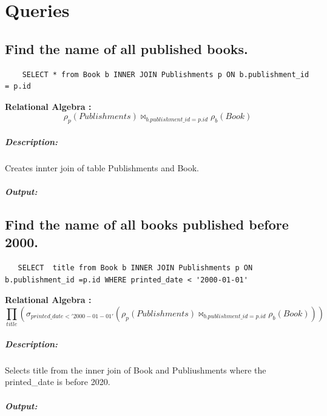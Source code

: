 \documentclass{report}
\begin{document}
\chapter{Queries}

\section{Find the name of all published books.}

\begin{lstlisting}
    SELECT * from Book b INNER JOIN Publishments p ON b.publishment_id = p.id
\end{lstlisting}
\vspace{0.5cm}
\textbf{Relational Algebra :} \[  \rho_p(Publishments) \bowtie_{b.publishment\_id = p.id}  \rho_b(Book)   \]
\paragraph{Description: }
Creates innter join of table Publishments and Book.

\paragraph{Output: }



\section{Find the name of all books published before 2000.}

\begin{lstlisting}
   SELECT  title from Book b INNER JOIN Publishments p ON b.publishment_id =p.id WHERE printed_date < '2000-01-01'
\end{lstlisting}
\vspace{0.5cm}
\textbf{Relational Algebra :} \[ \prod_{title}(\sigma_{printed\_date < '2000-01-01'}( \rho_p(Publishments) \bowtie_{b.publishment\_id = p.id}  \rho_b(Book)) ) \]
\paragraph{Description: }
Selects title from the inner join of Book and Publiushments where the printed\_date is before 2020. 

\paragraph{Output: }

\end{document}
